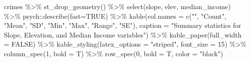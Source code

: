 \documentclass[
]{article}
\newenvironment{Shaded}{\begin{snugshade}}{\end{snugshade}}
\newcommand{\AttributeTok}[1]{\textcolor[rgb]{0.77,0.63,0.00}{#1}}
\newcommand{\ConstantTok}[1]{\textcolor[rgb]{0.00,0.00,0.00}{#1}}
\newcommand{\DecValTok}[1]{\textcolor[rgb]{0.00,0.00,0.81}{#1}}
\newcommand{\FunctionTok}[1]{\textcolor[rgb]{0.00,0.00,0.00}{#1}}
\newcommand{\NormalTok}[1]{#1}
\newcommand{\SpecialCharTok}[1]{\textcolor[rgb]{0.00,0.00,0.00}{#1}}
\newcommand{\StringTok}[1]{\textcolor[rgb]{0.31,0.60,0.02}{#1}}
\begin{document}
\begin{Shaded}
\begin{Highlighting}[]
\NormalTok{crimes }\SpecialCharTok{\%\textgreater{}\%} 
  \FunctionTok{st\_drop\_geometry}\NormalTok{() }\SpecialCharTok{\%\textgreater{}\%} 
  \FunctionTok{select}\NormalTok{(slope, elev, median\_income) }\SpecialCharTok{\%\textgreater{}\%} 
\NormalTok{  psych}\SpecialCharTok{::}\FunctionTok{describe}\NormalTok{(}\AttributeTok{fast=}\ConstantTok{TRUE}\NormalTok{) }\SpecialCharTok{\%\textgreater{}\%} 
  \FunctionTok{kable}\NormalTok{(}\AttributeTok{col.names =} \FunctionTok{c}\NormalTok{(}\StringTok{""}\NormalTok{, }\StringTok{"Count"}\NormalTok{, }\StringTok{"Mean"}\NormalTok{, }\StringTok{"SD"}\NormalTok{, }\StringTok{"Min"}\NormalTok{, }\StringTok{"Max"}\NormalTok{, }\StringTok{"Range"}\NormalTok{, }\StringTok{"SE"}\NormalTok{), }\AttributeTok{caption =} \StringTok{"Summary statistics for Slope, Elevation, and Median Income variables"}\NormalTok{) }\SpecialCharTok{\%\textgreater{}\%}
  \FunctionTok{kable\_paper}\NormalTok{(}\AttributeTok{full\_width =} \ConstantTok{FALSE}\NormalTok{) }\SpecialCharTok{\%\textgreater{}\%}
  \FunctionTok{kable\_styling}\NormalTok{(}\AttributeTok{latex\_options =} \StringTok{"striped"}\NormalTok{,}
                \AttributeTok{font\_size =} \DecValTok{15}\NormalTok{) }\SpecialCharTok{\%\textgreater{}\%} 
  \FunctionTok{column\_spec}\NormalTok{(}\DecValTok{1}\NormalTok{, }\AttributeTok{bold =}\NormalTok{ T) }\SpecialCharTok{\%\textgreater{}\%}
  \FunctionTok{row\_spec}\NormalTok{(}\DecValTok{0}\NormalTok{, }\AttributeTok{bold =}\NormalTok{ T, }\AttributeTok{color =} \StringTok{"black"}\NormalTok{)}
\end{Highlighting}
\end{Shaded}
\end{document}
